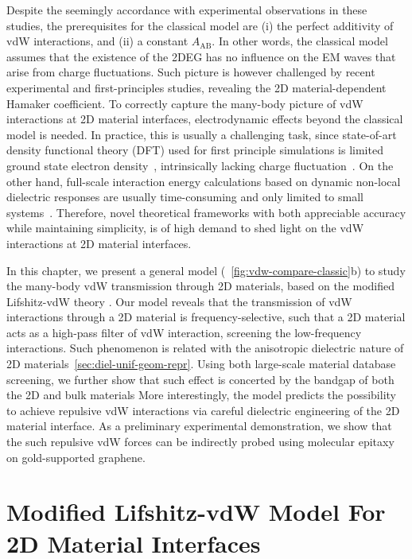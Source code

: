 Despite the seemingly accordance with experimental observations in
these studies, the prerequisites for the classical model are (i) the
perfect additivity of vdW interactions, and (ii) a constant
$A_{\mathrm{AB}}$. 
%
In other words, the classical model assumes that the existence of the
2DEG has no influence on the EM waves that arise from charge
fluctuations.
%
Such picture is however challenged by recent experimental
\cite{Tsoi_2014_vdW_screening_2D} and first-principles
\cite{Ambrosetti_2018_carbon,Liu_2018_gr,Li_2018_screen} studies,
revealing the 2D material-dependent Hamaker coefficient.
%
To correctly capture the many-body picture of vdW interactions at 2D
material interfaces, electro\-dynamic effects beyond the classical model
is needed.
%
In practice, this is usually a challenging task, since state-of-art
density functional theory (DFT) used for first principle simulations
is limited ground state electron density~\cite{Perdew_1996_GGA},
intrinsically lacking charge fluctuation~\cite{Woods_2016_rev_vdw}.
%
On the other hand, full-scale interaction energy calculations based on
dynamic non-local dielectric responses are usually time-consuming and
only limited to small
systems~\cite{Hermann_2017_vdW_rev,Zhou_2017_lifshitz}.
%
Therefore, novel theoretical frameworks with both appreciable accuracy
while maintaining simplicity, is of high demand to shed light on the
vdW interactions at 2D material interfaces.

In this chapter, we present
a general model (~\autoref{fig:vdw-compare-classic}b) to study the many-body vdW transmission
through 2D materials, based on the modified Lifshitz-vdW theory
\cite{Dzyaloshinskii_1961_lifshitz,parsegian_van_2010_book}.
%
Our model reveals that the transmission of vdW interactions through a
2D material is frequency-selective, such that a 2D material acts as a high-pass
filter of vdW interaction, screening the low-frequency interactions.
%
Such phenomenon is related with the anisotropic dielectric nature of 2D materials~\autoref{sec:diel-unif-geom-repr}.
%
Using both large-scale material database
screening, we further show that such effect is concerted by the bandgap of both the
2D and bulk materials 
%
More interestingly, the model predicts the possibility to achieve
repulsive vdW interactions  via careful dielectric
engineering of the 2D material interface.
%
As a preliminary experimental demonstration, we show that the such
repulsive vdW forces can be indirectly probed using molecular epitaxy
on gold-supported graphene.

\section{Modified Lifshitz-vdW Model For 2D Material Interfaces}
\label{sec:vdw-model-lifshitz}

